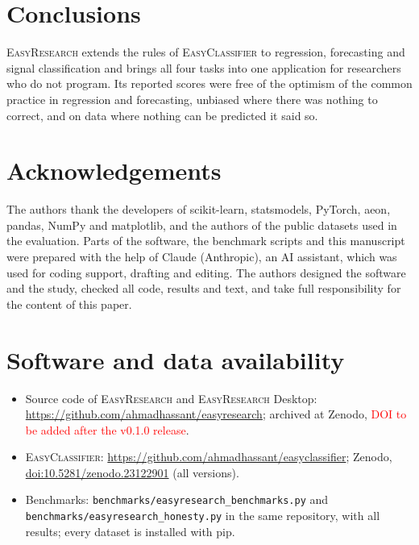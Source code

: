 \documentclass[11pt,a4paper]{article}
\newcommand{\ER}{\textsc{EasyResearch}}
\newcommand{\EC}{\textsc{EasyClassifier}}
\newcommand{\TBDDOI}{\textcolor{red}{DOI to be added after the v0.1.0 release}}
\begin{document}
\section{Conclusions}
\ER{} extends the rules of \EC{} to regression, forecasting and signal classification and brings all four tasks into one application for researchers who do not program. Its reported scores were free of the optimism of the common practice in regression and forecasting, unbiased where there was nothing to correct, and on data where nothing can be predicted it said so.

\section*{Acknowledgements}
The authors thank the developers of scikit-learn, statsmodels, PyTorch, aeon, pandas, NumPy and matplotlib, and the authors of the public datasets used in the evaluation. Parts of the software, the benchmark scripts and this manuscript were prepared with the help of Claude (Anthropic), an AI assistant, which was used for coding support, drafting and editing. The authors designed the software and the study, checked all code, results and text, and take full responsibility for the content of this paper.

\section*{Software and data availability}
{\sloppy
\begin{itemize}
  \item Source code of \ER{} and \ER{} Desktop: \url{https://github.com/ahmadhassant/easyresearch}; archived at Zenodo, \TBDDOI.
  \item \EC: \url{https://github.com/ahmadhassant/easyclassifier}; Zenodo, \href{https://doi.org/10.5281/zenodo.23122901}{doi:10.5281/zenodo.23122901} (all versions).
  \item Benchmarks: \nolinkurl{benchmarks/easyresearch_benchmarks.py} and \nolinkurl{benchmarks/easyresearch_honesty.py} in the same repository, with all results; every dataset is installed with pip.
\end{itemize}}



\end{document}
